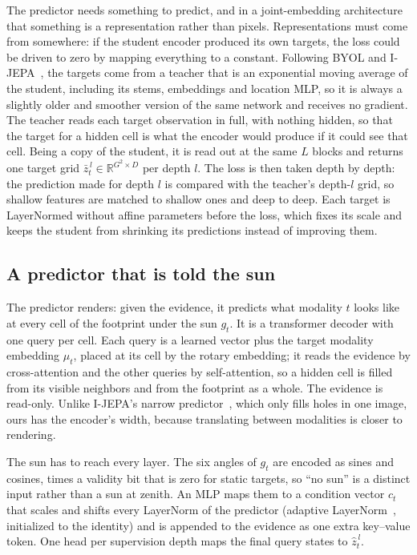 The predictor needs something to predict, and in a joint-embedding architecture that something is a representation rather than pixels. Representations must come from somewhere: if the student encoder produced its own targets, the loss could be driven to zero by mapping everything to a constant. Following BYOL and I-JEPA~\cite{grill2020bootstrap,assran2023self}, the targets come from a teacher that is an exponential moving average of the student, including its stems, embeddings and location MLP, so it is always a slightly older and smoother version of the same network and receives no gradient. The teacher reads each target observation in full, with nothing hidden, so that the target for a hidden cell is what the encoder would produce if it could see that cell. Being a copy of the student, it is read out at the same $L$ blocks and returns one target grid $\bar z^{\,l}_t \in \mathbb{R}^{G^2\times D}$ per depth $l$. The loss is then taken depth by depth: the prediction made for depth $l$ is compared with the teacher's depth-$l$ grid, so shallow features are matched to shallow ones and deep to deep. Each target is LayerNormed without affine parameters before the loss, which fixes its scale and keeps the student from shrinking its predictions instead of improving them.

\subsection{A predictor that is told the sun}
\label{sec:predictor}

The predictor renders: given the evidence, it predicts what modality $t$ looks like at every cell of the footprint under the sun $g_t$. It is a transformer decoder with one query per cell. Each query is a learned vector plus the target modality embedding $\mu_t$, placed at its cell by the rotary embedding; it reads the evidence by cross-attention and the other queries by self-attention, so a hidden cell is filled from its visible neighbors and from the footprint as a whole. The evidence is read-only. Unlike I-JEPA's narrow predictor~\cite{assran2023self}, which only fills holes in one image, ours has the encoder's width, because translating between modalities is closer to rendering.

The sun has to reach every layer. The six angles of $g_t$ are encoded as sines and cosines, times a validity bit that is zero for static targets, so ``no sun'' is a distinct input rather than a sun at zenith. An MLP maps them to a condition vector $c_t$ that scales and shifts every LayerNorm of the predictor (adaptive LayerNorm~\cite{peebles2023scalable}, initialized to the identity) and is appended to the evidence as one extra key--value token. One head per supervision depth maps the final query states to $\hat z^{\,l}_t$.

